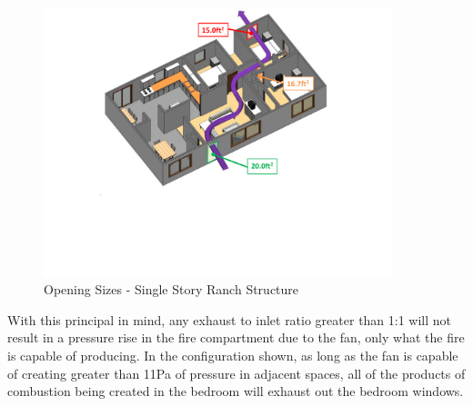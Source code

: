 \documentclass{article}
\begin{document}
\begin{figure}[H]
	\centering
	\includegraphics[width = 4in]{0_Images/Tactical_Considerations/PPA_Exhaust_Dependant/Opening_Sizes.pdf}
	\caption{Opening Sizes - Single Story Ranch Structure}
	\label{fig:RanchStructureOpenings}
\end{figure}

With this principal in mind, any exhaust to inlet ratio greater than 1:1 will not result in a pressure rise in the fire compartment due to the fan, only what the fire is capable of producing. In the configuration shown, as long as the fan is capable of creating greater than 11Pa of pressure in adjacent spaces, all of the products of combustion being created in the bedroom will exhaust out the bedroom windows. 
\end{document}
